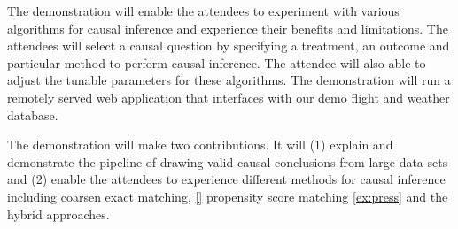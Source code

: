 
\vspace{-0.1cm}


\vspace{-2mm}

The demonstration will enable the attendees to experiment with various algorithms for causal inference
  and experience their benefits and limitations.
The attendees will select a causal question by specifying a treatment,
  an outcome and particular method to perform causal inference.
The attendee will also able to adjust the tunable parameters for these algorithms.
The demonstration will run a remotely served web application that interfaces with our demo flight and weather database.

The demonstration will make two contributions. It will
  (1) explain and demonstrate the pipeline of drawing valid causal conclusions from large data sets and
  (2) enable the attendees to experience different methods for causal inference including coarsen exact matching, \ref{} propensity score matching \ref{ex:press} and the hybrid approaches.
